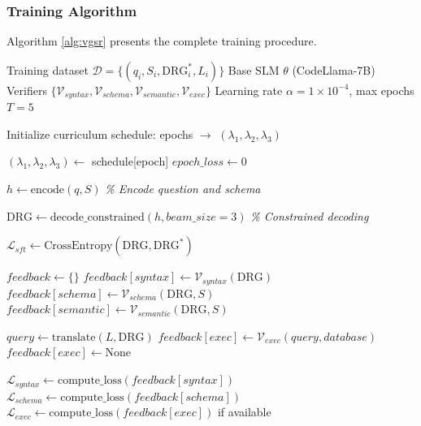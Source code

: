 \documentclass[conference]{IEEEtran}
\begin{document}
\subsubsection{Training Algorithm}

Algorithm \ref{alg:vgsr} presents the complete training procedure.

\begin{algorithm}[t]
\caption{VGSR Training with Curriculum Learning}
\label{alg:vgsr}
\begin{algorithmic}[1]
\REQUIRE Training dataset $\mathcal{D} = \{(q_i, S_i, \text{DRG}_i^*, L_i)\}$
\REQUIRE Base SLM $\theta$ (CodeLlama-7B)
\REQUIRE Verifiers $\{\mathcal{V}_{syntax}, \mathcal{V}_{schema}, \mathcal{V}_{semantic}, \mathcal{V}_{exec}\}$
\REQUIRE Learning rate $\alpha = 1 \times 10^{-4}$, max epochs $T=5$

\STATE Initialize curriculum schedule: epochs $\to$ $(\lambda_1, \lambda_2, \lambda_3)$

  \STATE $(\lambda_1, \lambda_2, \lambda_3) \gets$ schedule[epoch]
  \STATE $epoch\_loss \gets 0$
  
      
      \STATE $h \gets \text{encode}(q, S)$ \quad \textit{\% Encode question and schema}
      
      \STATE $\text{DRG} \gets \text{decode\_constrained}(h, beam\_size=3)$ \quad \textit{\% Constrained decoding}
      
      \STATE $\mathcal{L}_{sft} \gets \text{CrossEntropy}(\text{DRG}, \text{DRG}^*)$
      
      \STATE $feedback \gets \{\}$
      \STATE $feedback[syntax] \gets \mathcal{V}_{syntax}(\text{DRG})$
      \STATE $feedback[schema] \gets \mathcal{V}_{schema}(\text{DRG}, S)$
      \STATE $feedback[semantic] \gets \mathcal{V}_{semantic}(\text{DRG}, S)$
      
        \STATE $query \gets \text{translate}(L, \text{DRG})$
        \STATE $feedback[exec] \gets \mathcal{V}_{exec}(query, database)$
      \ELSE
        \STATE $feedback[exec] \gets \text{None}$
      \ENDIF
      
      \STATE $\mathcal{L}_{syntax} \gets \text{compute\_loss}(feedback[syntax])$
      \STATE $\mathcal{L}_{schema} \gets \text{compute\_loss}(feedback[schema])$
      \STATE $\mathcal{L}_{exec} \gets \text{compute\_loss}(feedback[exec])$ if available
      

\end{algorithmic}
\end{algorithm}
\end{document}
